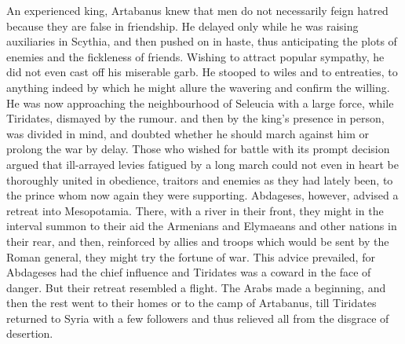 
An experienced king, Artabanus knew that men do not necessarily feign hatred because they are false in friendship. He delayed only while he was raising auxiliaries in Scythia, and then pushed on in haste, thus anticipating the plots of enemies and the fickleness of friends. Wishing to attract popular sympathy, he did not even cast off his miserable garb. He stooped to wiles and to entreaties, to anything indeed by which he might allure the wavering and confirm the willing. He was now approaching the neighbourhood of Seleucia with a large force, while Tiridates, dismayed by the rumour. and then by the king's presence in person, was divided in mind, and doubted whether he should march against him or prolong the war by delay. Those who wished for battle with its prompt decision argued that ill-arrayed levies fatigued by a long march could not even in heart be thoroughly united in obedience, traitors and enemies as they had lately been, to the prince whom now again they were supporting. Abdageses, however, advised a retreat into Mesopotamia. There, with a river in their front, they might in the interval summon to their aid the Armenians and Elymaeans and other nations in their rear, and then, reinforced by allies and troops which would be sent by the Roman general, they might try the fortune of war. This advice prevailed, for Abdageses had the chief influence and Tiridates was a coward in the face of danger. But their retreat resembled a flight. The Arabs made a beginning, and then the rest went to their homes or to the camp of Artabanus, till Tiridates returned to Syria with a few followers and thus relieved all from the disgrace of desertion.


